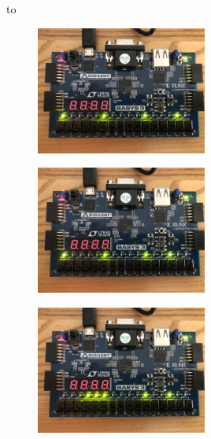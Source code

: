 to\documentclass[11pt]{article}
\begin{document}
\begin{figure}[H]
\begin{center}
	\includegraphics[width=0.5\textwidth]{./images/Part1/l9p1img5.jpg}
	\caption{\label{fig:part1_img5}}
\end{center}
\end{figure}

\begin{figure}[H]
\begin{center}
	\includegraphics[width=0.5\textwidth]{./images/Part1/l9p1img6.jpg}
	\caption{\label{fig:part1_img6}}
\end{center}
\end{figure}

\begin{figure}[H]
\begin{center}
	\includegraphics[width=0.5\textwidth]{./images/Part1/l9p1img7.jpg}
	\caption{\label{fig:part1_img7}}
\end{center}
\end{figure}
\end{document}
